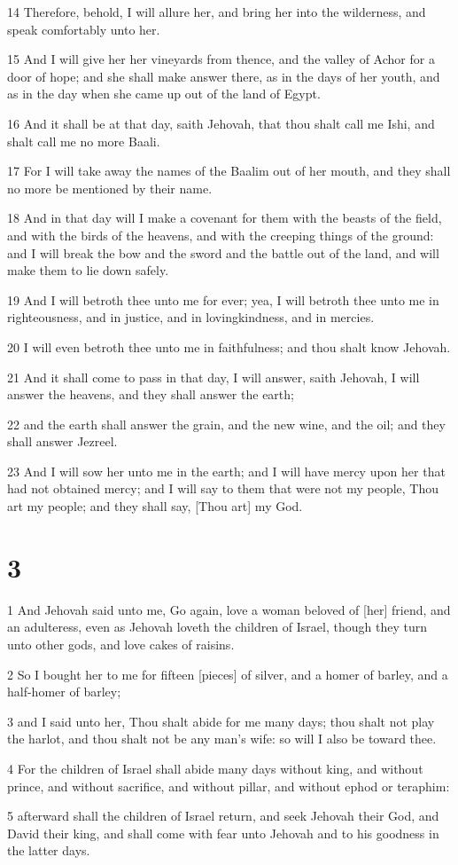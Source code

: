 \par 14 Therefore, behold, I will allure her, and bring her into the wilderness, and speak comfortably unto her.
\par 15 And I will give her her vineyards from thence, and the valley of Achor for a door of hope; and she shall make answer there, as in the days of her youth, and as in the day when she came up out of the land of Egypt.
\par 16 And it shall be at that day, saith Jehovah, that thou shalt call me Ishi, and shalt call me no more Baali.
\par 17 For I will take away the names of the Baalim out of her mouth, and they shall no more be mentioned by their name.
\par 18 And in that day will I make a covenant for them with the beasts of the field, and with the birds of the heavens, and with the creeping things of the ground: and I will break the bow and the sword and the battle out of the land, and will make them to lie down safely.
\par 19 And I will betroth thee unto me for ever; yea, I will betroth thee unto me in righteousness, and in justice, and in lovingkindness, and in mercies.
\par 20 I will even betroth thee unto me in faithfulness; and thou shalt know Jehovah.
\par 21 And it shall come to pass in that day, I will answer, saith Jehovah, I will answer the heavens, and they shall answer the earth;
\par 22 and the earth shall answer the grain, and the new wine, and the oil; and they shall answer Jezreel.
\par 23 And I will sow her unto me in the earth; and I will have mercy upon her that had not obtained mercy; and I will say to them that were not my people, Thou art my people; and they shall say, [Thou art] my God.

\chapter{3}

\par 1 And Jehovah said unto me, Go again, love a woman beloved of [her] friend, and an adulteress, even as Jehovah loveth the children of Israel, though they turn unto other gods, and love cakes of raisins.
\par 2 So I bought her to me for fifteen [pieces] of silver, and a homer of barley, and a half-homer of barley;
\par 3 and I said unto her, Thou shalt abide for me many days; thou shalt not play the harlot, and thou shalt not be any man's wife: so will I also be toward thee.
\par 4 For the children of Israel shall abide many days without king, and without prince, and without sacrifice, and without pillar, and without ephod or teraphim:
\par 5 afterward shall the children of Israel return, and seek Jehovah their God, and David their king, and shall come with fear unto Jehovah and to his goodness in the latter days.

